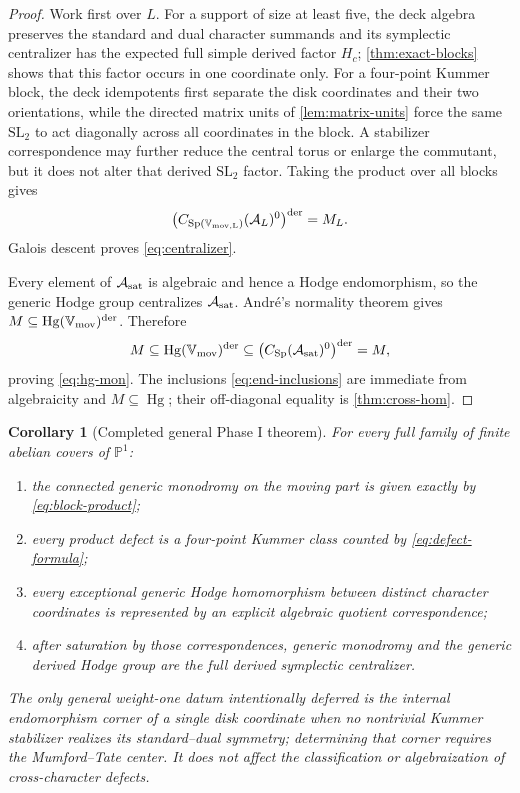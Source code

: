 \documentclass[11pt]{article}
\newtheorem{corollary}[theorem]{Corollary}
\theoremstyle{definition}
\theoremstyle{remark}
\newcommand{\PP}{\mathbb P}
\newcommand{\Hg}{\operatorname{Hg}}
\newcommand{\Sp}{\operatorname{Sp}}
\begin{document}
\begin{proof}
Work first over $L$.  For a support of size at least five, the deck algebra preserves the standard and dual character summands and its symplectic centralizer has the expected full simple derived factor $H_c$; \cref{thm:exact-blocks} shows that this factor occurs in one coordinate only.  For a four-point Kummer block, the deck idempotents first separate the disk coordinates and their two orientations, while the directed matrix units of \cref{lem:matrix-units} force the same $\mathrm{SL}_2$ to act diagonally across all coordinates in the block.  A stabilizer correspondence may further reduce the central torus or enlarge the commutant, but it does not alter that derived $\mathrm{SL}_2$ factor.  Taking the product over all blocks gives
\[
 \bigl(C_{\Sp(\mathbb V_{\rm mov,L})}(\mathcal A_L)^0\bigr)^{\rm der}=M_L.
\]
Galois descent proves \eqref{eq:centralizer}.

Every element of $\mathcal A_{\rm sat}$ is algebraic and hence a Hodge endomorphism, so the generic Hodge group centralizes $\mathcal A_{\rm sat}$.  Andr\'e's normality theorem gives
$M\subseteq\Hg(\mathbb V_{\rm mov})^{\rm der}$.  Therefore
\[
 M
 \subseteq\Hg(\mathbb V_{\rm mov})^{\rm der}
 \subseteq
 \bigl(C_{\Sp}(\mathcal A_{\rm sat})^0\bigr)^{\rm der}
 =M,
\]
proving \eqref{eq:hg-mon}.  The inclusions \eqref{eq:end-inclusions} are immediate from algebraicity and $M\subseteq\Hg$; their off-diagonal equality is \cref{thm:cross-hom}.
\end{proof}

\begin{corollary}[Completed general Phase I theorem]\label{cor:phase-I}
For every full family of finite abelian covers of $\PP^1$:
\begin{enumerate}
\item the connected generic monodromy on the moving part is given exactly by \eqref{eq:block-product};
\item every product defect is a four-point Kummer class counted by \eqref{eq:defect-formula};
\item every exceptional generic Hodge homomorphism between distinct character coordinates is represented by an explicit algebraic quotient correspondence;
\item after saturation by those correspondences, generic monodromy and the generic derived Hodge group are the full derived symplectic centralizer.
\end{enumerate}
The only general weight-one datum intentionally deferred is the internal endomorphism corner of a single disk coordinate when no nontrivial Kummer stabilizer realizes its standard--dual symmetry; determining that corner requires the Mumford--Tate center.  It does not affect the classification or algebraization of cross-character defects.
\end{corollary}
\end{document}
